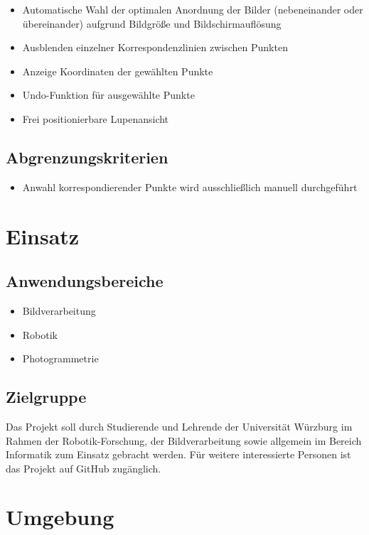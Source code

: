 \documentclass[a4paper,10pt]{scrartcl}
\begin{document}
\begin{itemize}
    \item Automatische Wahl der optimalen Anordnung der Bilder (nebeneinander oder übereinander) aufgrund Bildgröße und Bildschirmauflösung
    \item Ausblenden einzelner Korrespondenzlinien zwischen Punkten
    \item Anzeige Koordinaten der gewählten Punkte
    \item Undo-Funktion für ausgewählte Punkte
    \item Frei positionierbare Lupenansicht
\end{itemize}

\subsection{Abgrenzungskriterien}

\begin{itemize}
    \item Anwahl korrespondierender Punkte wird ausschließlich manuell durchgeführt
\end{itemize}


\section{Einsatz}

\subsection{Anwendungsbereiche}
\begin{itemize}
	\item Bildverarbeitung
	\item Robotik
	\item Photogrammetrie
\end{itemize}


\subsection{Zielgruppe}

Das Projekt soll durch Studierende und Lehrende der Universität Würzburg im Rahmen der Robotik-Forschung, der Bildverarbeitung sowie allgemein im Bereich Informatik zum Einsatz gebracht werden. Für weitere interessierte Personen ist das Projekt auf GitHub zugänglich.


\section{Umgebung}
\end{document}
